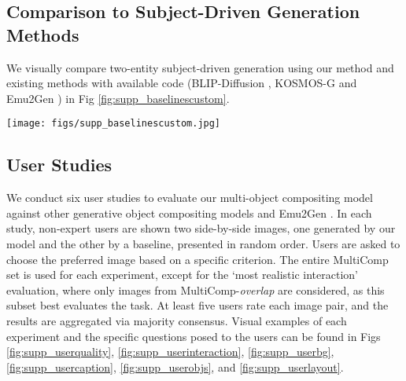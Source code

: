 \subsection{Comparison to Subject-Driven Generation Methods}
\label{sec:supp_custombaselines}

We visually compare two-entity subject-driven generation using our method and existing methods with available code (BLIP-Diffusion \cite{li2024blip}, KOSMOS-G \cite{pan2023kosmos} and Emu2Gen \cite{sun2024emugen}) in Fig \ref{fig:supp_baselinescustom}.

\begin{figure*}[t]
    \centering
    \texttt{[image: figs/supp\_baselinescustom.jpg]}
    \caption{Visual comparison of our Customization Method and State-of-the-Art Subject-Driven Generation Methods \cite{li2024blip,pan2023kosmos,sun2024emugen}.}

    \label{fig:supp_baselinescustom}
\end{figure*}

\subsection{User Studies}
\label{sec:supp_userstudies}

We conduct six user studies to evaluate our multi-object compositing model against other generative object compositing models \cite{yang2023paintbyexample,zhang2023controlcom,chen2023anydoor,song2024imprint,tarres2024thinking} and Emu2Gen \cite{sun2024emugen}. In each study, non-expert users are shown two side-by-side images, one generated by our model and the other by a baseline, presented in random order. Users are asked to choose the preferred image based on a specific criterion. The entire MultiComp set is used for each experiment, except for the `most realistic interaction' evaluation, where only images from MultiComp-\textit{overlap} are considered, as this subset best evaluates the task. At least five users rate each image pair, and the results are aggregated via majority consensus. Visual examples of each experiment and the specific questions posed to the users can be found in Figs \ref{fig:supp_userquality}, \ref{fig:supp_userinteraction}, \ref{fig:supp_userbg}, \ref{fig:supp_usercaption}, \ref{fig:supp_userobjs}, and \ref{fig:supp_userlayout}.


